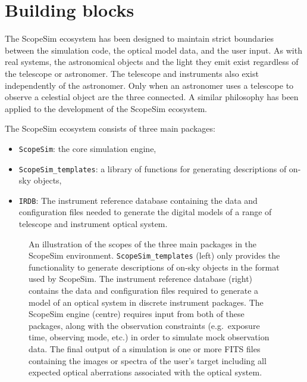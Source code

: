 

\section{Building blocks}
\label{building-blocks}

The ScopeSim ecosystem has been designed to maintain strict boundaries between the simulation code, the optical model data, and the user input.
As with real systems, the astronomical objects and the light they emit exist regardless of the telescope or astronomer.
The telescope and instruments also exist independently of the astronomer.
Only when an astronomer uses a telescope to observe a celestial object are the three connected.
A similar philosophy has been applied to the development of the ScopeSim ecosystem.

The ScopeSim ecosystem consists of three main packages:
\begin{itemize}
\item \lstinline{ScopeSim}: the core simulation engine,

\item \lstinline{ScopeSim_templates}: a library of functions for generating descriptions of on-sky objects,

\item \lstinline{IRDB}: The instrument reference database containing the data and configuration files needed to generate the digital models of a range of telescope and instrument optical system.
\end{itemize}

\begin{figure}
\label{fig-ecosystem}
\caption{An illustration of the scopes of the three main packages in the ScopeSim environment.
\lstinline{ScopeSim_templates} (left) only provides the functionality to generate descriptions of on-sky objects in the format used by ScopeSim.
The instrument reference database (right) contains the data and configuration files required to generate a model of an optical system in discrete instrument packages.
The ScopeSim engine (centre) requires input from both of these packages, along with the observation constraints (e.g.~exposure time, observing mode, etc.) in order to simulate mock observation data.
The final output of a simulation is one or more FITS files containing the images or spectra of the user's  target including all expected optical aberrations associated with the optical system.}
\end{figure}

